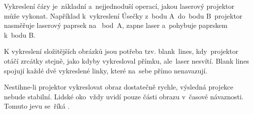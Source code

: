 Vykreslení čáry je~základní a~nejjednoduší operací, jakou laserový projektor může vykonat. Například  k~vykreslení Úsečky z~bodu A~do~bodu  B~projektor nasměřuje laserový paprsek na ~bod~A, zapne laser a~pohybuje paprskem  k~bodu B.

K vykreslení složitějších obrázků jsou potřeba tzv. blank\ lines,  kdy~projektor otáčí zrcátky stejně, jako kdyby vykresloval přímku,  ale~laser nesvítí. Blank lines spojují každé dvě vykreslené linky, které na~sebe přímo nenavazují.

Nestihne-li projektor vykreslovat obraz dostatečně rychle, výsledná projekce nebude stabilní. Lidské  oko~vždy uvidí pouze části obrazu  v~časové návaznosti. Tomuto jevu se~říká .
